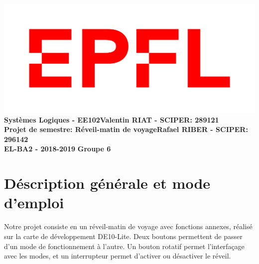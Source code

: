 \documentclass[a4paper, 11pt]{article}
\begin{document}
\noindent \includegraphics[scale=0.2]{figures/logo.png}\\
\large \textbf{Systèmes Logiques - EE102}\hfill \textbf{Valentin RIAT - SCIPER: 289121}\\
 \hfill \large \textbf{Projet de semestre: Réveil-matin de voyage}\hfill \textbf{Rafael RIBER - SCIPER: 296142}\\
 \large \textbf{EL-BA2 - 2018-2019} \hfill \large \textbf{Groupe 6}

\section{Déscription générale et mode d'emploi}
Notre projet consiste en un réveil-matin de voyage avec fonctions annexes, réalisé sur la carte de développement DE10-Lite. Deux boutons permettent de passer d'un mode de fonctionnement à l'autre. Un bouton rotatif permet l'interfaçage avec les modes, et un interrupteur permet d'activer ou désactiver le réveil.
\end{document}
